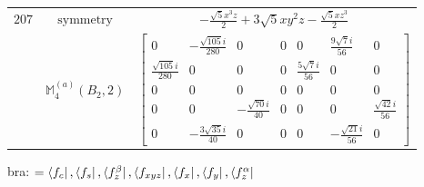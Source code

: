 \documentclass[fleqn,8pt,landscape]{jsarticle}
\begin{document}
\begin{longtable}{ccc}
$ 207 $ & $ \text{symmetry} $ & $ - \frac{\sqrt{5} x^{3} z}{2} + 3 \sqrt{5} x y^{2} z - \frac{\sqrt{5} x z^{3}}{2} $ \\
$  $ & $ \mathbb{M}_{4}^{(a)}(B_{2},2) $ & $ \begin{bmatrix} 0 & - \frac{\sqrt{105} i}{280} & 0 & 0 & 0 & \frac{9 \sqrt{7} i}{56} & 0 \\ \frac{\sqrt{105} i}{280} & 0 & 0 & 0 & \frac{5 \sqrt{7} i}{56} & 0 & 0 \\ 0 & 0 & 0 & 0 & 0 & 0 & 0 \\ 0 & 0 & - \frac{\sqrt{70} i}{40} & 0 & 0 & 0 & \frac{\sqrt{42} i}{56} \\ 0 & - \frac{3 \sqrt{35} i}{40} & 0 & 0 & 0 & - \frac{\sqrt{21} i}{56} & 0 \end{bmatrix} $ \\ \hline
\end{longtable}
bra: $=\bra{f_{c}}, \bra{f_{s}}, \bra{f_{z}^{\beta}}, \bra{f_{xyz}}, \bra{f_{x}}, \bra{f_{y}}, \bra{f_{z}^{\alpha}}$
\end{document}

